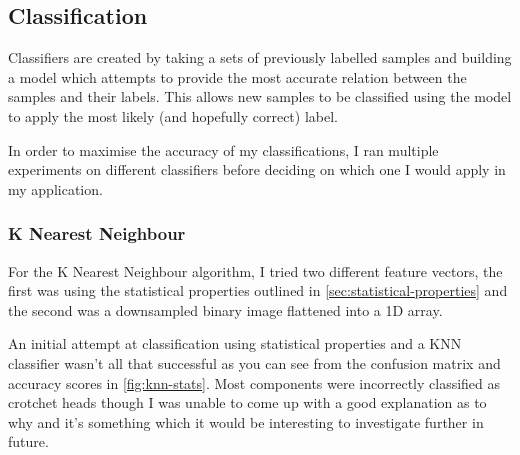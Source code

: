 \subsection{Classification}
\label{sec:implementation-classification}

Classifiers are created by taking a sets of previously labelled samples and building a model which attempts to provide the most accurate relation between the samples and their labels. This allows new samples to be classified using the model to apply the most likely (and hopefully correct) label.

In order to maximise the accuracy of my classifications, I ran multiple experiments on different classifiers before deciding on which one I would apply in my application.

\subsubsection{K Nearest Neighbour}

For the K Nearest Neighbour algorithm, I tried two different feature vectors, the first was using the statistical properties outlined in \cref{sec:statistical-properties} and the second was a downsampled binary image flattened into a 1D array. 

An initial attempt at classification using statistical properties and a KNN classifier wasn't all that successful as you can see from the confusion matrix and accuracy scores in \cref{fig:knn-stats}. Most components were incorrectly classified as crotchet heads though I was unable to come up with a good explanation as to why and it's something which it would be interesting to investigate further in future.

